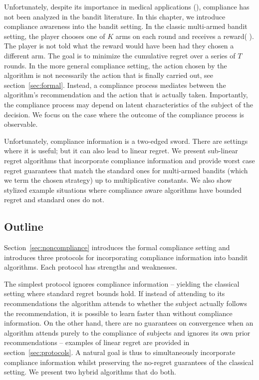 Unfortunately, despite its importance in medical applications (\cite{vrijens:12,hugtenburg:13}), compliance has not been analyzed in the bandit literature.
In this chapter, we introduce compliance awareness into the bandit setting.
In the classic multi-armed bandit setting, the player chooses one of $K$ arms on each round and receives a reward( \cite{auer:02b,auer:02}). The player is not told what the reward would have been had they chosen a different arm. The goal is to minimize the cumulative regret over a series of $T$ rounds. In the more general compliance setting, the action chosen by the algorithm is not necessarily the action that is finally carried out, see section~\ref{sec:formal}. Instead, a compliance process mediates between the algorithm's recommendation and the action that is actually taken. Importantly, the compliance process may depend on latent characteristics of the subject of the decision. We focus on the case where the outcome of the compliance process is observable.

Unfortunately, compliance information is a two-edged sword. There are settings where it is useful; but  it can also lead to linear regret. We present sub-linear regret algorithms that incorporate compliance information and provide worst case regret guarantees that match the standard ones for multi-armed bandits (which we term the chosen strategy) up to multiplicative constants. We also show stylized example situations where compliance aware algorithms have bounded regret and standard ones do not.


\subsection{Outline}
Section~\ref{sec:noncompliance} introduces the formal compliance setting and introduces three protocols for incorporating compliance information into bandit algorithms. Each protocol has strengths and weaknesses.

The simplest protocol ignores compliance information -- yielding the classical setting where standard regret bounds hold. If instead of attending to its recommendations the algorithm attends to whether the subject actually follows the recommendation, it is possible to learn faster than without compliance information. On the other hand, there are no guarantees on convergence when an algorithm attends purely to the compliance of subjects and ignores its own prior recommendations -- examples of linear regret are provided in section~\ref{sec:protocols}. A natural goal is thus to simultaneously incorporate compliance information whilst preserving the no-regret guarantees of the classical setting. We present two hybrid algorithms that do both.


